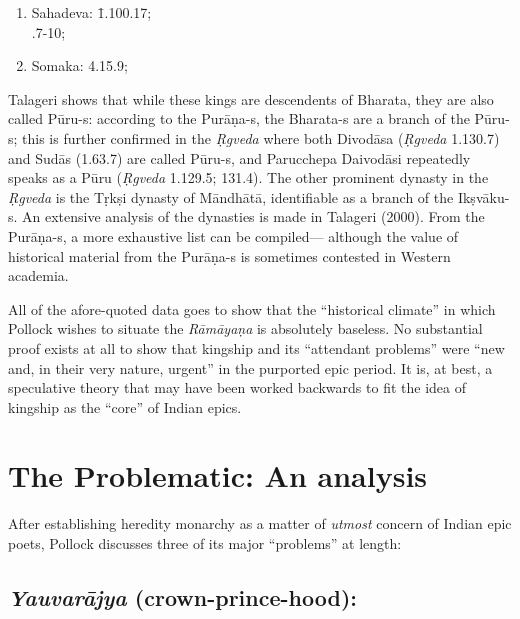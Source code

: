 \begin{enumerate}
\item 
\begin{tabbing}
Sahadeva: \= 1.100.17;\\
.7-10;
\end{tabbing}

\item Somaka: 4.15.9;
\end{enumerate}

Talageri shows that while these kings are descendents of Bharata, they are also called Pūru-s: according to the Purāṇa-s, the \hbox{Bharata-s} are a branch of the Pūru-s; this is further confirmed in the {\sl Ṛgveda} where both Divodāsa ({\sl Ṛgveda} 1.130.7) and Sudās (1.63.7) are called Pūru-s, and Parucchepa Daivodāsi repeatedly speaks as a Pūru ({\sl Ṛgveda} 1.129.5; 131.4). The other prominent dynasty in the {\sl Ṛgveda} is the Tṛkṣi dynasty of Māndhātā, identifiable as a branch of the Ikṣvāku-s. An extensive analysis of the dynasties is made in Talageri (2000). From the Purāṇa-s, a more exhaustive list can be compiled--- although the value of historical material from the Purāṇa-s is sometimes contested in Western academia.

All of the afore-quoted data goes to show that the “historical climate” in which Pollock wishes to situate the {\sl Rāmāyaṇa} is absolutely baseless. No substantial proof exists at all to show that kingship and its “attendant problems” were “new and, in their very nature, urgent” in the purported epic period. It is, at best, a speculative theory that may have been worked backwards to fit the idea of kingship as the “core” of Indian epics.\\[-21pt]  

\section{The Problematic: An analysis}\label{sec1.2}

After establishing heredity monarchy as a matter of {\sl utmost} concern of Indian epic poets, Pollock discusses three of its major “problems” at length:\\[-21pt]   

\subsection[{\sl Yauvarājya} (crown-prince-hood):]{{\sl\bfseries Yauvarājya} (crown-prince-hood):}\label{sec1.2.1}

